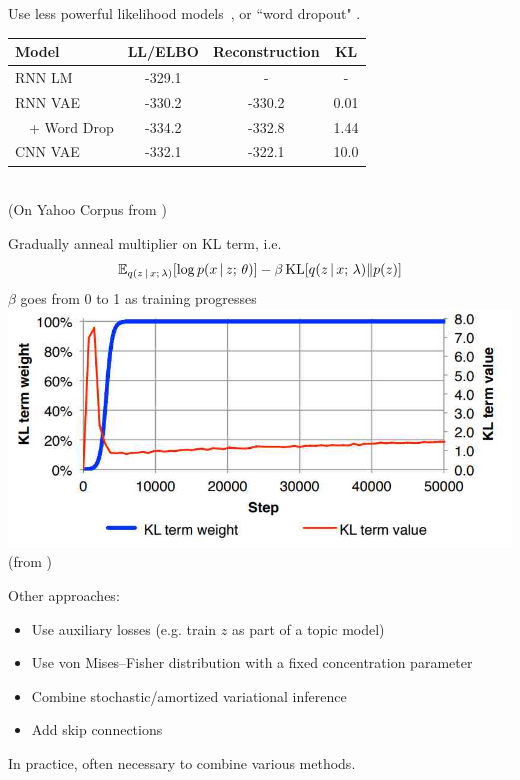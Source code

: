 \begin{frame}
Use less powerful likelihood models~\citep{Miao2016,Yang2017},
or ``word dropout" \citep{Bowman2016}. \\
\vspace{2mm}
\center
\begin{tabular}{l c c c }
\toprule
     Model & LL/ELBO & Reconstruction & KL \\
\midrule     
     RNN LM & -329.1 & - & - \\
     RNN VAE & -330.2 & -330.2 & 0.01 \\
     $\,\,\,\,$ + Word Drop & -334.2 & -332.8 & 1.44\\
     CNN VAE & -332.1 & -322.1 & 10.0 \\ 
\bottomrule
\end{tabular} \\
\vspace{5mm}
(On Yahoo Corpus from \cite{Yang2017}) \\
\end{frame} 

\begin{frame}
Gradually anneal multiplier on KL term, i.e.
\[\mathbb{E}_{q(z \,|\, x ; \, \lambda)}[\log p( x \,|\, z ; \, \theta)] - \beta\operatorname*{KL}[q(z \,|\, x ; \, \lambda) \Vert p(z)] \]
$\beta$ goes from 0 to 1 as training progresses
\\
\center
\includegraphics[scale=0.25]{kllambda.jpg}
\\
(from \cite{Bowman2016})
\end{frame} 

\begin{frame}
Other approaches:
\begin{itemize}
    \item Use auxiliary losses (e.g. train $z$ as part of a topic model) \citep{Dieng2017,wang2017topic}
    \item Use von Mises--Fisher distribution with a fixed concentration parameter  \citep{Guu2017,xu2018}
    \item Combine stochastic/amortized variational inference \citep{Kim2018}
    \item Add skip connections \citep{dieng2018}
\end{itemize}
\air
\air
In practice, often necessary to combine various methods.
\end{frame} 

